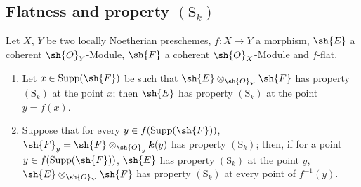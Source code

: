 \subsection{Flatness and property \texorpdfstring{$(\mathrm{S}_k)$}{(Sk)}}
\label{subsection:IV.6.4}

\begin{proposition}[6.4.1]
\label{IV.6.4.1}
Let $X$, $Y$ be two locally Noetherian preschemes, $f:X\to Y$ a morphism, $\sh{E}$ a coherent $\sh{O}_Y$-Module, $\sh{F}$ a coherent $\sh{O}_X$-Module and $f$-flat.
\begin{enumerate}[label=(\roman*)]
  \item Let $x\in\operatorname{Supp}(\sh{F})$ be such that $\sh{E}\otimes_{\sh{O}_Y}\sh{F}$ has property $(\mathrm{S}_k)$ at the point $x$; then $\sh{E}$ has property $(\mathrm{S}_k)$ at the point $y=f(x)$.
  \item Suppose that for every $y\in f(\operatorname{Supp}(\sh{F}))$, $\sh{F}_y=\sh{F}\otimes_{\sh{O}_y}\boldsymbol{k}(y)$ has property $(\mathrm{S}_k)$; then, if for a point $y\in f(\operatorname{Supp}(\sh{F}))$, $\sh{E}$ has property $(\mathrm{S}_k)$ at the point $y$, $\sh{E}\otimes_{\sh{O}_Y}\sh{F}$ has property $(\mathrm{S}_k)$ at every point of $f^{-1}(y)$.
\end{enumerate}
\end{proposition}

